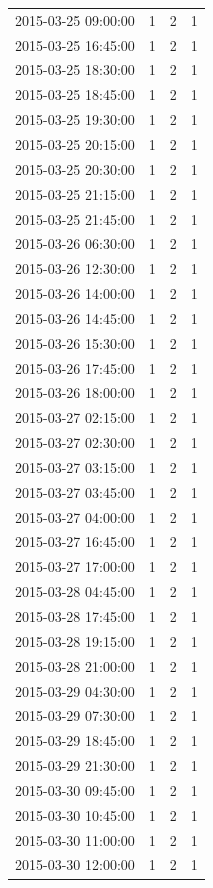 \begin{tabular}{lrrr}
2015-03-25 09:00:00 & 1 & 2 & 1 \\
2015-03-25 16:45:00 & 1 & 2 & 1 \\
2015-03-25 18:30:00 & 1 & 2 & 1 \\
2015-03-25 18:45:00 & 1 & 2 & 1 \\
2015-03-25 19:30:00 & 1 & 2 & 1 \\
2015-03-25 20:15:00 & 1 & 2 & 1 \\
2015-03-25 20:30:00 & 1 & 2 & 1 \\
2015-03-25 21:15:00 & 1 & 2 & 1 \\
2015-03-25 21:45:00 & 1 & 2 & 1 \\
2015-03-26 06:30:00 & 1 & 2 & 1 \\
2015-03-26 12:30:00 & 1 & 2 & 1 \\
2015-03-26 14:00:00 & 1 & 2 & 1 \\
2015-03-26 14:45:00 & 1 & 2 & 1 \\
2015-03-26 15:30:00 & 1 & 2 & 1 \\
2015-03-26 17:45:00 & 1 & 2 & 1 \\
2015-03-26 18:00:00 & 1 & 2 & 1 \\
2015-03-27 02:15:00 & 1 & 2 & 1 \\
2015-03-27 02:30:00 & 1 & 2 & 1 \\
2015-03-27 03:15:00 & 1 & 2 & 1 \\
2015-03-27 03:45:00 & 1 & 2 & 1 \\
2015-03-27 04:00:00 & 1 & 2 & 1 \\
2015-03-27 16:45:00 & 1 & 2 & 1 \\
2015-03-27 17:00:00 & 1 & 2 & 1 \\
2015-03-28 04:45:00 & 1 & 2 & 1 \\
2015-03-28 17:45:00 & 1 & 2 & 1 \\
2015-03-28 19:15:00 & 1 & 2 & 1 \\
2015-03-28 21:00:00 & 1 & 2 & 1 \\
2015-03-29 04:30:00 & 1 & 2 & 1 \\
2015-03-29 07:30:00 & 1 & 2 & 1 \\
2015-03-29 18:45:00 & 1 & 2 & 1 \\
2015-03-29 21:30:00 & 1 & 2 & 1 \\
2015-03-30 09:45:00 & 1 & 2 & 1 \\
2015-03-30 10:45:00 & 1 & 2 & 1 \\
2015-03-30 11:00:00 & 1 & 2 & 1 \\
2015-03-30 12:00:00 & 1 & 2 & 1 \\

\end{tabular}
